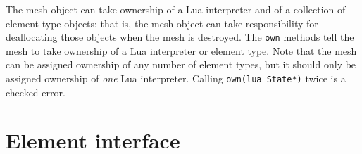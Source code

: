 \documentclass{article}
\newcommand{\ttt}[1]{\texttt{#1}}
\begin{document}
The mesh object can take ownership of a Lua interpreter and of a
collection of element type objects: that is, the mesh object can take
responsibility for deallocating those objects when the mesh is
destroyed.  The \ttt{own} methods tell the mesh to take ownership
of a Lua interpreter or element type.  Note that the mesh can be
assigned ownership of any number of element types, but it should only
be assigned ownership of \emph{one} Lua interpreter.  Calling
\ttt{own(lua\_State*)} twice is a checked error.



\section{Element interface}
\label{section-element-interface}
\end{document}
